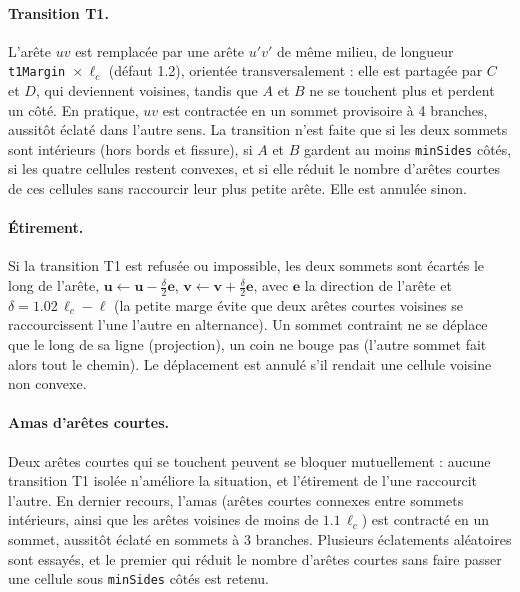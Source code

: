 \documentclass[11pt,a4paper]{article}
\newcommand{\code}[1]{\texttt{#1}}
\begin{document}
\paragraph{Transition T1.} L'arête $uv$ est remplacée par une arête $u'v'$ de même milieu, de longueur
\code{t1Margin}~$\times\,\ell_c$ (défaut 1.2), orientée transversalement : elle est partagée par $C$ et $D$, qui
deviennent voisines, tandis que $A$ et $B$ ne se touchent plus et perdent un côté. En pratique, $uv$ est contractée
en un sommet provisoire à 4 branches, aussitôt éclaté dans l'autre sens. La transition n'est faite que si les
deux sommets sont intérieurs (hors bords et fissure), si $A$ et $B$ gardent au moins \code{minSides} côtés, si les
quatre cellules restent convexes, et si elle réduit le nombre d'arêtes courtes de ces cellules sans raccourcir leur
plus petite arête. Elle est annulée sinon.

\paragraph{Étirement.} Si la transition T1 est refusée ou impossible, les deux sommets sont écartés le long de
l'arête, $\mathbf u \leftarrow \mathbf u - \tfrac{\delta}{2}\mathbf e$,
$\mathbf v \leftarrow \mathbf v + \tfrac{\delta}{2}\mathbf e$, avec $\mathbf e$ la direction de l'arête et
$\delta=1.02\,\ell_c-\ell$ (la petite marge évite que deux arêtes courtes voisines se raccourcissent l'une
l'autre en alternance). Un sommet contraint ne se déplace que le long de sa ligne (projection), un coin ne bouge
pas (l'autre sommet fait alors tout le chemin). Le déplacement est annulé s'il rendait une cellule voisine non
convexe.

\paragraph{Amas d'arêtes courtes.} Deux arêtes courtes qui se touchent peuvent se bloquer mutuellement : aucune
transition T1 isolée n'améliore la situation, et l'étirement de l'une raccourcit l'autre. En dernier recours,
l'amas (arêtes courtes connexes entre sommets intérieurs, ainsi que les arêtes voisines de moins de
$1.1\,\ell_c$) est contracté en un sommet, aussitôt éclaté en sommets à 3 branches. Plusieurs éclatements
aléatoires sont essayés, et le premier qui réduit le nombre d'arêtes courtes sans faire passer une cellule sous
\code{minSides} côtés est retenu.
\end{document}
